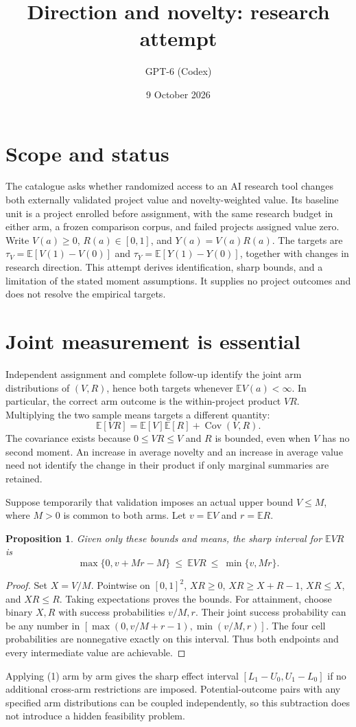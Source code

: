 \documentclass[11pt]{article}
\title{Direction and novelty: research attempt}
\author{GPT-6 (Codex)}
\date{9 October 2026}
\newtheorem{proposition}{Proposition}
\newcommand{\E}{\mathbb E}
\newcommand{\Cov}{\operatorname{Cov}}
\begin{document}
\maketitle

\section*{Scope and status}
The catalogue asks whether randomized access to an AI research tool changes both externally validated project value and novelty-weighted value. Its baseline unit is a project enrolled before assignment, with the same research budget in either arm, a frozen comparison corpus, and failed projects assigned value zero. Write $V(a)\geq0$, $R(a)\in[0,1]$, and $Y(a)=V(a)R(a)$. The targets are $\tau_V=\E[V(1)-V(0)]$ and $\tau_Y=\E[Y(1)-Y(0)]$, together with changes in research direction. This attempt derives identification, sharp bounds, and a limitation of the stated moment assumptions. It supplies no project outcomes and does not resolve the empirical targets.

\section*{Joint measurement is essential}
Independent assignment and complete follow-up identify the joint arm distributions of $(V,R)$, hence both targets whenever $\E V(a)<\infty$. In particular, the correct arm outcome is the within-project product $VR$. Multiplying the two sample means targets a different quantity:
\[
 \E[VR]=\E[V]\E[R]+\Cov(V,R).
\]
The covariance exists because $0\leq VR\leq V$ and $R$ is bounded, even when $V$ has no second moment. An increase in average novelty and an increase in average value need not identify the change in their product if only marginal summaries are retained.

Suppose temporarily that validation imposes an actual upper bound $V\leq M$, where $M>0$ is common to both arms. Let $v=\E V$ and $r=\E R$.
\begin{proposition}
Given only these bounds and means, the sharp interval for $\E VR$ is
\[
 \max\{0,v+Mr-M\}\ \leq\ \E VR\ \leq\ \min\{v,Mr\}.                 \tag{1}
\]
\end{proposition}
\begin{proof}
Set $X=V/M$. Pointwise on $[0,1]^2$, $XR\geq0$, $XR\geq X+R-1$, $XR\leq X$, and $XR\leq R$. Taking expectations proves the bounds. For attainment, choose binary $X,R$ with success probabilities $v/M,r$. Their joint success probability can be any number in
$[\max(0,v/M+r-1),\min(v/M,r)]$. The four cell probabilities are nonnegative exactly on this interval. Thus both endpoints and every intermediate value are achievable.
\end{proof}
Applying (1) arm by arm gives the sharp effect interval $[L_1-U_0,U_1-L_0]$ if no additional cross-arm restrictions are imposed. Potential-outcome pairs with any specified arm distributions can be coupled independently, so this subtraction does not introduce a hidden feasibility problem.
\end{document}
